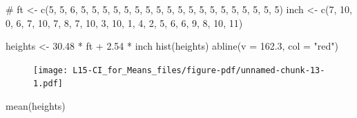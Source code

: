 \documentclass[
  letterpaper,
  DIV=11,
  numbers=noendperiod,
  oneside]{scrreprt}
\newenvironment{Shaded}{\begin{snugshade}}{\end{snugshade}}
\newcommand{\AttributeTok}[1]{\textcolor[rgb]{0.40,0.45,0.13}{#1}}
\newcommand{\CommentTok}[1]{\textcolor[rgb]{0.37,0.37,0.37}{#1}}
\newcommand{\DecValTok}[1]{\textcolor[rgb]{0.68,0.00,0.00}{#1}}
\newcommand{\FloatTok}[1]{\textcolor[rgb]{0.68,0.00,0.00}{#1}}
\newcommand{\FunctionTok}[1]{\textcolor[rgb]{0.28,0.35,0.67}{#1}}
\newcommand{\NormalTok}[1]{\textcolor[rgb]{0.00,0.23,0.31}{#1}}
\newcommand{\OtherTok}[1]{\textcolor[rgb]{0.00,0.23,0.31}{#1}}
\newcommand{\SpecialCharTok}[1]{\textcolor[rgb]{0.37,0.37,0.37}{#1}}
\newcommand{\StringTok}[1]{\textcolor[rgb]{0.13,0.47,0.30}{#1}}
\begin{document}
\begin{Shaded}
\begin{Highlighting}[]
\CommentTok{\# }
\NormalTok{ft }\OtherTok{\textless{}{-}} \FunctionTok{c}\NormalTok{(}\DecValTok{5}\NormalTok{, }\DecValTok{5}\NormalTok{, }\DecValTok{6}\NormalTok{, }\DecValTok{5}\NormalTok{, }\DecValTok{5}\NormalTok{, }\DecValTok{5}\NormalTok{, }\DecValTok{5}\NormalTok{, }\DecValTok{5}\NormalTok{, }\DecValTok{5}\NormalTok{, }\DecValTok{5}\NormalTok{, }\DecValTok{5}\NormalTok{, }\DecValTok{5}\NormalTok{, }\DecValTok{5}\NormalTok{, }\DecValTok{5}\NormalTok{, }\DecValTok{5}\NormalTok{, }\DecValTok{5}\NormalTok{, }\DecValTok{5}\NormalTok{, }\DecValTok{5}\NormalTok{, }\DecValTok{5}\NormalTok{, }\DecValTok{5}\NormalTok{, }\DecValTok{5}\NormalTok{, }\DecValTok{5}\NormalTok{)}
\NormalTok{inch }\OtherTok{\textless{}{-}} \FunctionTok{c}\NormalTok{(}\DecValTok{7}\NormalTok{, }\DecValTok{10}\NormalTok{, }\DecValTok{0}\NormalTok{, }\DecValTok{6}\NormalTok{, }\DecValTok{7}\NormalTok{, }\DecValTok{10}\NormalTok{, }\DecValTok{7}\NormalTok{, }\DecValTok{8}\NormalTok{, }\DecValTok{7}\NormalTok{, }\DecValTok{10}\NormalTok{, }\DecValTok{3}\NormalTok{, }\DecValTok{10}\NormalTok{, }\DecValTok{1}\NormalTok{, }\DecValTok{4}\NormalTok{, }\DecValTok{2}\NormalTok{, }\DecValTok{5}\NormalTok{, }\DecValTok{6}\NormalTok{, }\DecValTok{6}\NormalTok{, }\DecValTok{9}\NormalTok{, }\DecValTok{8}\NormalTok{, }\DecValTok{10}\NormalTok{, }\DecValTok{11}\NormalTok{)}

\NormalTok{heights }\OtherTok{\textless{}{-}} \FloatTok{30.48} \SpecialCharTok{*}\NormalTok{ ft }\SpecialCharTok{+} \FloatTok{2.54} \SpecialCharTok{*}\NormalTok{ inch}
\FunctionTok{hist}\NormalTok{(heights)}
\FunctionTok{abline}\NormalTok{(}\AttributeTok{v =} \FloatTok{162.3}\NormalTok{, }\AttributeTok{col =} \StringTok{"red"}\NormalTok{)}
\end{Highlighting}
\end{Shaded}

\begin{figure}[H]

{\centering \texttt{[image: L15-CI\_for\_Means\_files/figure-pdf/unnamed-chunk-13-1.pdf]}

}

\end{figure}

\begin{Shaded}
\begin{Highlighting}[]
\FunctionTok{mean}\NormalTok{(heights)}
\end{Highlighting}
\end{Shaded}
\end{document}
